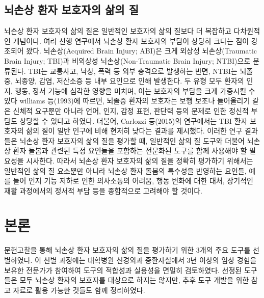 \documentclass{article}
\begin{document}
\subsection{뇌손상 환자 보호자의 삶의 질}
뇌손상 환자 보호자의 삶의 질은 일반적인 보호자의 삶의 질보다 더 복잡하고 다차원적인 개념이다. 여러 선행 연구에서 뇌손상 환자 보호자의 부담이 상당히 크다는 점이 강조되어 왔다.
뇌손상(Acquired Brain Injury; ABI)은 크게 외상성 뇌손상(Traumatic Brain Injury; TBI)과 비외상성 뇌손상(Non-Traumatic Brain Injury; NTBI)으로 분류된다\cite{giustini2013traumatic}. 
TBI는 교통사고, 낙상, 폭력 등 외부 충격으로 발생하는 반면, NTBI는 뇌졸중, 뇌종양, 감염, 저산소증 등 내부 요인으로 인해 발생한다.
두 유형 모두 환자의 인지, 행동, 정서 기능에 심각한 영향을 미치며, 이는 보호자의 부담을 크게 가중시킬 수 있다
williams 등(1993)에 따르면, 뇌졸중 환자의 보호자는 보행 보조나 들어올리기 같은 신체적 요구뿐만 아니라 언어, 인지, 감정 표현, 판단력 등의 문제로 인한 정신적 부담도 상당할 수 있다고 하였다\cite{williams1993caregivers}.
더불어, Carlozzi 등(2015)의 연구에서는 TBI 환자 보호자의 삶의 질이 일반 인구에 비해 현저히 낮다는 결과를 제시했다\cite{carlozzi2015health}.
이러한 연구 결과들은 뇌손상 환자 보호자의 삶의 질을 평가할 때, 일반적인 삶의 질 도구와 더불어 뇌손상 환자 돌봄과 관련된 특정 요인들을 포함하는 전문화된 도구를 함께 사용해야 할 필요성을 시사한다.
따라서 뇌손상 환자 보호자의 삶의 질을 정확히 평가하기 위해서는 일반적인 삶의 질 요소뿐만 아니라 뇌손상 환자 돌봄의 특수성을 반영하는 요인들,
예를 들어 인지 기능 저하로 인한 의사소통의 어려움, 행동 변화에 대한 대처, 장기적인 재활 과정에서의 정서적 부담 등을 종합적으로 고려해야 할 것이다.


\section{본론}
문헌고찰을 통해 뇌손상 환자 보호자의 삶의 질을 평가하기 위한 3개의 주요 도구를 선별하였다. 이 선별 과정에는 대학병원 신경외과 중환자실에서 3년 이상의 임상 경험을 보유한 전문가가 참여하여 도구의 적합성과 실용성을 면밀히 검토하였다. 선정된 도구들은 모두 뇌손상 환자의 보호자를 대상으로 하지는 않지만, 추후 도구 개발을 위한 참고 자료로 활용 가능한 것들도 함께 정리하였다.
\end{document}
